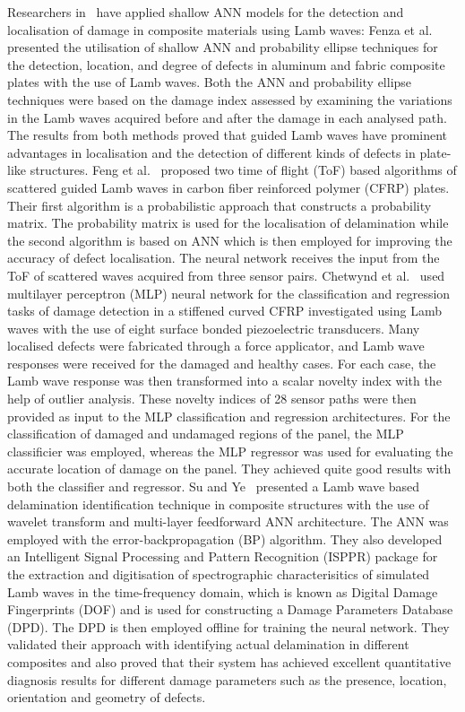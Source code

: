 Researchers in~\cite{de2015application, feng2019locating,chetwynd2008damage} have applied shallow ANN models for the detection and localisation of damage in composite materials using Lamb waves:
Fenza et al.~\cite{de2015application} presented the utilisation of shallow ANN and probability ellipse techniques for the detection, location, and degree of defects in aluminum and fabric composite plates with the use of Lamb waves. 
Both the ANN and probability ellipse techniques were based on the damage index assessed by examining the variations in the Lamb waves acquired before and after the damage in each analysed path. 
The results from both methods proved that guided Lamb waves have prominent advantages in localisation and the detection of different kinds of defects in plate-like structures. 
Feng et al.~\cite{feng2019locating} proposed two time of flight (ToF) based algorithms of scattered guided Lamb waves in carbon fiber reinforced polymer (CFRP) plates. 
Their first algorithm is a probabilistic approach that constructs a probability matrix. The probability matrix is used for the localisation of delamination while the second algorithm is based on ANN which is then employed for improving the accuracy of defect localisation. 
The neural network receives the input from the ToF of scattered waves acquired from three sensor pairs.
Chetwynd et al.~\cite{chetwynd2008damage} used multilayer perceptron (MLP) neural network for the classification and regression tasks of damage detection in a stiffened curved CFRP investigated using Lamb waves with the use of eight surface bonded piezoelectric transducers. 
Many localised defects were fabricated through a force applicator, and Lamb wave responses were received for the damaged and healthy cases. 
For each case, the Lamb wave response was then transformed into a scalar novelty index with the help of outlier analysis. 
These novelty indices of 28 sensor paths were then provided as input to the MLP classification and regression architectures. 
For the classification of damaged and undamaged regions of the panel, the MLP classificier was employed, whereas the MLP regressor was used for evaluating the accurate location of damage on the panel. 
They achieved quite good results with both the classifier and regressor. 
Su and Ye~\cite{Su2004b} presented a Lamb wave based delamination identification technique in composite structures with the use of wavelet transform and multi-layer feedforward ANN architecture. 
The ANN was employed with the error-backpropagation (BP) algorithm. 
They also developed an Intelligent Signal Processing and Pattern Recognition (ISPPR) package for the extraction and digitisation of spectrographic characterisitics of simulated Lamb waves in the time-frequency domain, which is known as Digital Damage Fingerprints (DOF) and is used for constructing a Damage Parameters Database (DPD). 
The DPD is then employed offline for training the neural network. 
They validated their approach with identifying actual delamination in different composites and also proved that their system has achieved excellent quantitative diagnosis results for different damage parameters such as the presence, location, orientation and geometry of defects.

